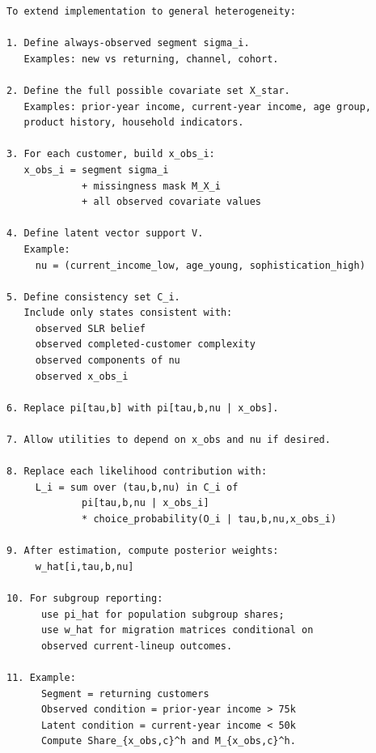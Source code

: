 \documentclass[11pt]{article}
\begin{document}
\begin{Verbatim}[fontsize=\small, frame=single]
To extend implementation to general heterogeneity:

1. Define always-observed segment sigma_i.
   Examples: new vs returning, channel, cohort.

2. Define the full possible covariate set X_star.
   Examples: prior-year income, current-year income, age group,
   product history, household indicators.

3. For each customer, build x_obs_i:
   x_obs_i = segment sigma_i
             + missingness mask M_X_i
             + all observed covariate values

4. Define latent vector support V.
   Example:
     nu = (current_income_low, age_young, sophistication_high)

5. Define consistency set C_i.
   Include only states consistent with:
     observed SLR belief
     observed completed-customer complexity
     observed components of nu
     observed x_obs_i

6. Replace pi[tau,b] with pi[tau,b,nu | x_obs].

7. Allow utilities to depend on x_obs and nu if desired.

8. Replace each likelihood contribution with:
     L_i = sum over (tau,b,nu) in C_i of
             pi[tau,b,nu | x_obs_i]
             * choice_probability(O_i | tau,b,nu,x_obs_i)

9. After estimation, compute posterior weights:
     w_hat[i,tau,b,nu]

10. For subgroup reporting:
      use pi_hat for population subgroup shares;
      use w_hat for migration matrices conditional on
      observed current-lineup outcomes.

11. Example:
      Segment = returning customers
      Observed condition = prior-year income > 75k
      Latent condition = current-year income < 50k
      Compute Share_{x_obs,c}^h and M_{x_obs,c}^h.
\end{Verbatim}
\end{document}
